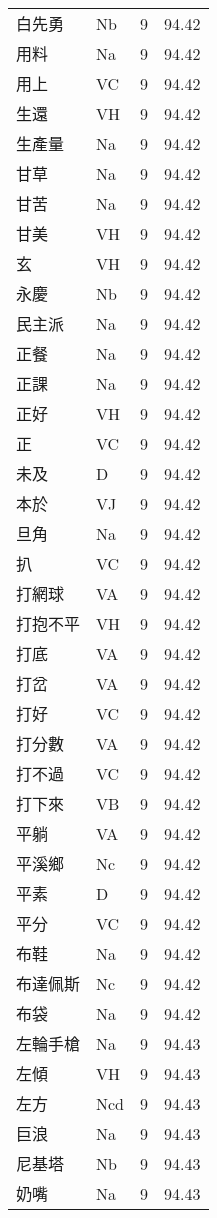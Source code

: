 \documentclass[twocolumn]{book}
\begin{document}
\begin{supertabular}{llrr}
白先勇 & Nb & 9 &  94.42\\
用料 & Na & 9 &  94.42\\
用上 & VC & 9 &  94.42\\
生還 & VH & 9 &  94.42\\
生產量 & Na & 9 &  94.42\\
甘草 & Na & 9 &  94.42\\
甘苦 & Na & 9 &  94.42\\
甘美 & VH & 9 &  94.42\\
玄 & VH & 9 &  94.42\\
永慶 & Nb & 9 &  94.42\\
民主派 & Na & 9 &  94.42\\
正餐 & Na & 9 &  94.42\\
正課 & Na & 9 &  94.42\\
正好 & VH & 9 &  94.42\\
正 & VC & 9 &  94.42\\
未及 & D & 9 &  94.42\\
本於 & VJ & 9 &  94.42\\
旦角 & Na & 9 &  94.42\\
扒 & VC & 9 &  94.42\\
打網球 & VA & 9 &  94.42\\
打抱不平 & VH & 9 &  94.42\\
打底 & VA & 9 &  94.42\\
打岔 & VA & 9 &  94.42\\
打好 & VC & 9 &  94.42\\
打分數 & VA & 9 &  94.42\\
打不過 & VC & 9 &  94.42\\
打下來 & VB & 9 &  94.42\\
平躺 & VA & 9 &  94.42\\
平溪鄉 & Nc & 9 &  94.42\\
平素 & D & 9 &  94.42\\
平分 & VC & 9 &  94.42\\
布鞋 & Na & 9 &  94.42\\
布達佩斯 & Nc & 9 &  94.42\\
布袋 & Na & 9 &  94.42\\
左輪手槍 & Na & 9 &  94.43\\
左傾 & VH & 9 &  94.43\\
左方 & Ncd & 9 &  94.43\\
巨浪 & Na & 9 &  94.43\\
尼基塔 & Nb & 9 &  94.43\\
奶嘴 & Na & 9 &  94.43\\

\end{supertabular}
\end{document}
